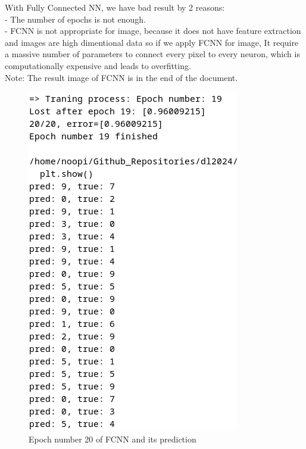 \documentclass{article}
\begin{document}
With Fully Connected NN, we have bad result by 2 reasons:\\
- The number of epochs is not enough. \\
- FCNN is not appropriate for image, because it does not have feature extraction and images are high dimentional data so if we apply FCNN for image, It require a massive number of parameters to connect every pixel to every neuron, which is computationally expensive and leads to overfitting. \\
Note: The result image of FCNN is in the end of the document. 
\begin{figure}[!ht]
    \centering
    \includegraphics[width=\linewidth]{FCNN_last-epoch.png}
    \caption{Epoch number 20 of FCNN and its prediction}
    \label{fig:fcnn}
\end{figure}
\end{document}
